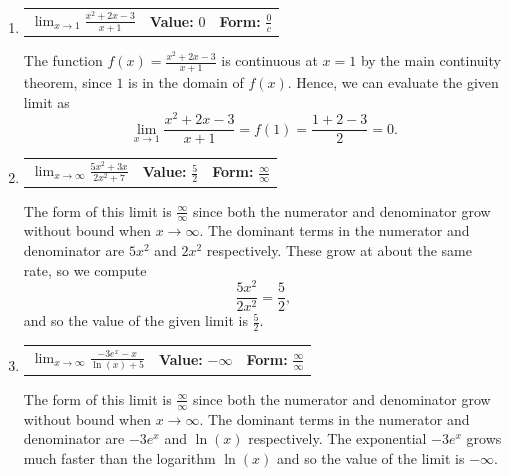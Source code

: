 \documentclass[11pt]{article}
\begin{document}
\begin{enumerate}
\begin{enumerate}
    \item 
    \begin{tabularx}{\textwidth}{lX X}
        $\displaystyle \lim_{x\to 1} \frac{x^2 + 2x - 3}{x+1}$ & 
        \textbf{Value:} {\color{blue}0} & 
        \textbf{Form:}  {\color{blue}$\frac0c$}
    \end{tabularx}
    \smallskip
    
  {\color{blue}
  The function \( f(x) = \frac{x^2+2x-3}{x+1} \) is continuous at \( x = 1 \) by the main continuity theorem, since \( 1 \) is in the domain of \( f(x) \). Hence, we can evaluate the given limit as
\[
  \lim_{x \to 1} \frac{x^2+2x-3}{x+1} = f(1) = \frac{1+2-3}{2} = 0.
\]}
\medskip



    \item 
    \begin{tabularx}{\textwidth}{lX X}
        $\displaystyle \lim_{x\to \infty} \frac{5x^2 + 3x}{2x^2 + 7}$ & 
        \textbf{Value:} {\color{blue}$\frac52$} & 
        \textbf{Form:} {\color{blue}$\frac{\infty}{\infty}$}
    \end{tabularx}
\smallskip
    
    {\color{blue}
    The form of this limit is \( \frac{\infty}{\infty} \) since both the numerator and denominator grow without bound when \( x \to \infty \). The dominant terms in the numerator and denominator are \( 5x^2 \) and \( 2x^2 \) respectively. These grow at about the same rate, so we compute
\[
  \frac{5x^2}{2x^2} = \frac{5}{2},
\]
and so the value of the given limit is \( \frac{5}{2} \).}
\bigskip

    \item 
    \begin{tabularx}{\textwidth}{lX X}
        $\displaystyle \lim_{x\to \infty} \frac{-3e^x - x}{\ln(x) + 5}$ & 
        \textbf{Value:} {\color{blue}$-\infty$} & 
        \textbf{Form:} {\color{blue}$\frac{\infty}{\infty}$}
    \end{tabularx}
\smallskip

{\color{blue}
The form of this limit is \( \frac{\infty}{\infty} \) since both the numerator and denominator grow without bound when \( x \to \infty \). The dominant terms in the numerator and denominator are \( -3e^x \) and \( \ln (x) \) respectively. The exponential \( -3e^x \) grows much faster than the logarithm \( \ln (x) \) and so the value of the limit is \( -\infty \).
}



\end{enumerate}
\end{enumerate}
\end{document}
